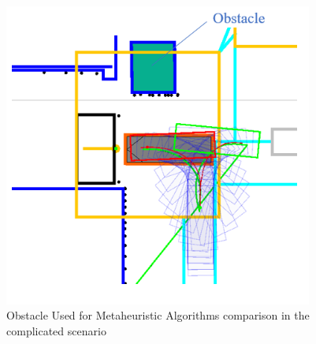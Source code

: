 \begin{figure}[H]
    \begin{center}
        \includegraphics[width=4in]{images/Chap3/obstacle_complicated.png} %
        \caption{Obstacle Used for Metaheuristic Algorithms comparison in the complicated scenario}
        \label{OptResult9}
        \end{center}    
\end{figure}

\begin{table}[H]
    \centering
    \caption{Comparison of Planning Time for Different Algorithms in Simple and Complicated Environments (in milliseconds)}
    \label{tab:planning_time}
\end{table}

